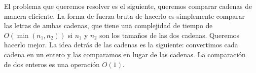 El problema que queremos resolver es el siguiente, queremos comparar cadenas de manera eficiente. La forma de fuerza bruta de hacerlo es simplemente comparar las letras de ambas cadenas, que tiene una complejidad de tiempo de $O(\min(n_1, n_2))$  si $n_1$ y $n_2$ son los tamaños de las dos cadenas. Queremos hacerlo mejor. La idea detrás de las cadenas es la siguiente: convertimos cada cadena en un entero y las comparamos en lugar de las cadenas. La comparación de dos enteros es una operación $O(1)$.